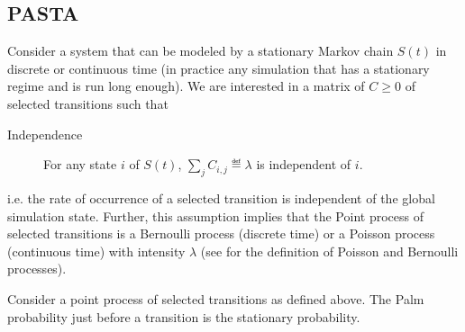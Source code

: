 %
\subsection{PASTA}
Consider a system that can be modeled by a stationary Markov
chain $S(t)$ in discrete or continuous time (in practice any
simulation that has a stationary regime and is run long
enough). We are interested in a matrix of $C\geq 0$ of selected
transitions such that
%
\begin{description}
  \item[Independence] For any state $i$ of $S(t)$, $\sum_j
      C_{i,j}\eqdef\lambda$ is independent of $i$.
\end{description}
%
i.e. the rate of occurrence of a selected transition is
independent of the global simulation state. Further, this
assumption implies that the Point process of selected
transitions is a Bernoulli process (discrete time) or a Poisson
process (continuous time) with intensity $\lambda$ (see
 for the definition of Poisson and Bernoulli
processes).

\begin{shadethm}[PASTA]
Consider a point process of selected transitions as defined
above. The Palm probability just before a transition is the
stationary probability.
\end{shadethm}

